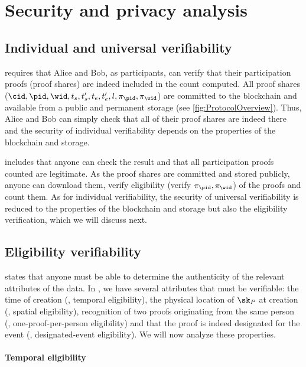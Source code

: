 \section{Security and privacy analysis}%
\label{SecurityAnalysis}

\subsection{Individual and universal verifiability}%
\label{analysis-individual}%
\label{analysis-universal}

 requires that Alice and Bob, as participants, can verify that their participation proofs (\ie proof shares) are indeed included in the count computed.
All proof shares (\ie \(\cid, \pid, \wid, t_s, t_s', t_e, t_e', l, \pi_\pid, \pi_{\wid}\)) are committed to the blockchain and available from a public and permanent storage (see \cref{fig:ProtocolOverview}).
Thus, Alice and Bob can simply check that all of their proof shares are indeed there and the security of individual verifiability depends on the properties of the blockchain and storage.

  includes that anyone can check the result and that all participation proofs counted are legitimate.
As the proof shares are committed and stored publicly, anyone can
download them, verify eligibility (\ie verify \(\pi_\pid,
\pi_{\wid}\)) of the proofs and count them.
As for individual verifiability, the security of universal verifiability is reduced to the properties of the blockchain and storage but also the eligibility verification, which we will discuss next.

\subsection{Eligibility verifiability}%
\label{analysis-eligibility}

 states that anyone must be able to determine the authenticity of the relevant attributes of the data.
In \PRIVO, we have several attributes that must be verifiable: the time of creation (\ie, temporal eligibility), the physical location of \(\sk_P\) at creation (\ie, spatial eligibility), recognition of two proofs originating from the same person (\ie, one-proof-per-person eligibility) and that the proof is indeed designated for the event (\ie, designated-event eligibility).
We will now analyze these properties.

\paragraph{Temporal eligibility}%
\label{analysis-temporal}

